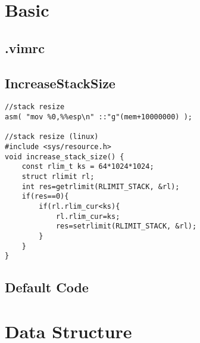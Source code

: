 \documentclass[10pt,twocolumn,oneside]{article}
\begin{document}
\pagestyle{fancy}
\fancyfoot{}
\fancyhead[R]{\thepage}
\renewcommand{\headrulewidth}{0.4pt}
\renewcommand{\contentsname}{Contents} 

\scriptsize
\tableofcontents
\section{Basic}
\subsection{.vimrc}




\subsection{IncreaseStackSize}
\begin{lstlisting}
//stack resize
asm( "mov %0,%%esp\n" ::"g"(mem+10000000) );

//stack resize (linux)
#include <sys/resource.h>
void increase_stack_size() {
	const rlim_t ks = 64*1024*1024;
	struct rlimit rl;
	int res=getrlimit(RLIMIT_STACK, &rl);
	if(res==0){
		if(rl.rlim_cur<ks){
			rl.rlim_cur=ks;
			res=setrlimit(RLIMIT_STACK, &rl);
		}
	}
}
\end{lstlisting}

\subsection{Default Code}

\newpage

\section{Data Structure}
\end{document}
